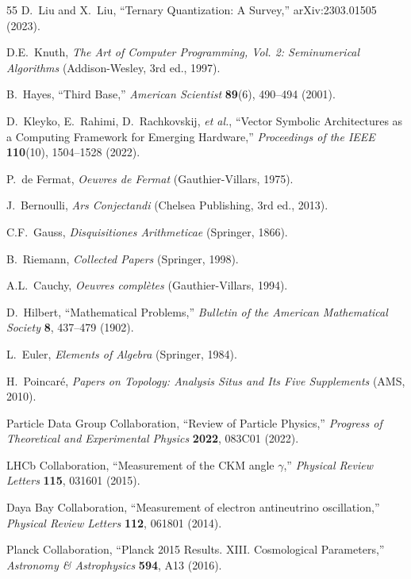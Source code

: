 \documentclass[aps,prd,preprint,superscriptaddress,showpacs,nofootinbib,longbibliography]{revtex4-2}
\begin{document}
\begin{thebibliography}{55}
D.~Liu and X.~Liu,
``Ternary Quantization: A Survey,''
arXiv:2303.01505 (2023).

D.E.~Knuth,
\textit{The Art of Computer Programming, Vol. 2: Seminumerical Algorithms} (Addison-Wesley, 3rd ed., 1997).

B.~Hayes,
``Third Base,''
\textit{American Scientist} \textbf{89}(6), 490--494 (2001).

D.~Kleyko, E.~Rahimi, D.~Rachkovskij, \textit{et al.},
``Vector Symbolic Architectures as a Computing Framework for Emerging Hardware,''
\textit{Proceedings of the IEEE} \textbf{110}(10), 1504--1528 (2022).


P.~de Fermat,
\textit{Oeuvres de Fermat} (Gauthier-Villars, 1975).

J.~Bernoulli,
\textit{Ars Conjectandi} (Chelsea Publishing, 3rd ed., 2013).

C.F.~Gauss,
\textit{Disquisitiones Arithmeticae} (Springer, 1866).

B.~Riemann,
\textit{Collected Papers} (Springer, 1998).

A.L.~Cauchy,
\textit{Oeuvres compl\`etes} (Gauthier-Villars, 1994).

D.~Hilbert,
``Mathematical Problems,''
\textit{Bulletin of the American Mathematical Society} \textbf{8}, 437--479 (1902).

L.~Euler,
\textit{Elements of Algebra} (Springer, 1984).

H.~Poincar\'e,
\textit{Papers on Topology: Analysis Situs and Its Five Supplements} (AMS, 2010).


Particle Data Group Collaboration,
``Review of Particle Physics,''
\textit{Progress of Theoretical and Experimental Physics} \textbf{2022}, 083C01 (2022).

LHCb Collaboration,
``Measurement of the CKM angle $\gamma$,''
\textit{Physical Review Letters} \textbf{115}, 031601 (2015).

Daya Bay Collaboration,
``Measurement of electron antineutrino oscillation,''
\textit{Physical Review Letters} \textbf{112}, 061801 (2014).

Planck Collaboration,
``Planck 2015 Results. XIII. Cosmological Parameters,''
\textit{Astronomy \& Astrophysics} \textbf{594}, A13 (2016).


\end{thebibliography}
\end{document}
